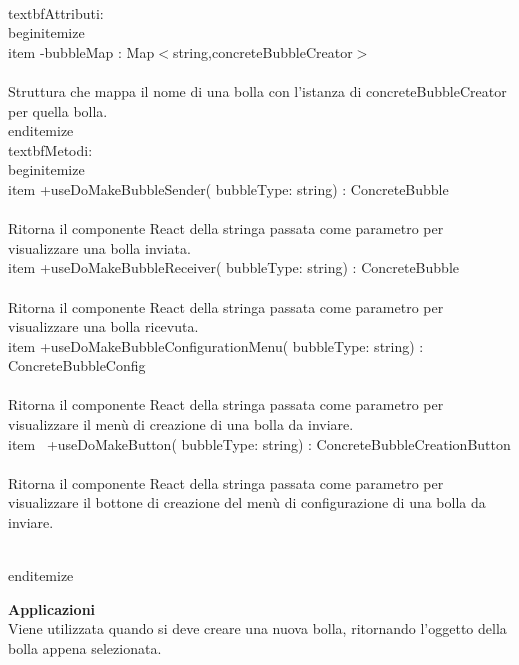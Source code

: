 \\textbf{Attributi:}
\\begin{itemize}
\\item -bubbleMap : Map$<$string,concreteBubbleCreator$>$ 
\\\\
Struttura che mappa il nome di una bolla con l'istanza di concreteBubbleCreator per quella bolla.
\\end{itemize}
\\textbf{Metodi:} 
\\begin{itemize}
\\item +useDoMakeBubbleSender( bubbleType: string) : ConcreteBubble \\\\
Ritorna il componente React della stringa passata come parametro per visualizzare una bolla inviata.
\\item +useDoMakeBubbleReceiver( bubbleType: string) : ConcreteBubble \\\\
Ritorna il componente React della stringa passata come parametro per visualizzare una bolla ricevuta.
\\item +useDoMakeBubbleConfigurationMenu( bubbleType: string) : ConcreteBubbleConfig 
\\\\
Ritorna il componente React della stringa passata come parametro per visualizzare il menù di creazione di una bolla da inviare.
\\item  +useDoMakeButton( bubbleType: string) : ConcreteBubbleCreationButton \\\\
Ritorna il componente React della stringa passata come parametro per visualizzare il bottone di creazione del menù di configurazione di una bolla da inviare.

\\end{itemize} 


\textbf{Applicazioni}\\
Viene utilizzata quando si deve creare una nuova bolla, ritornando l'oggetto della bolla appena selezionata. 


